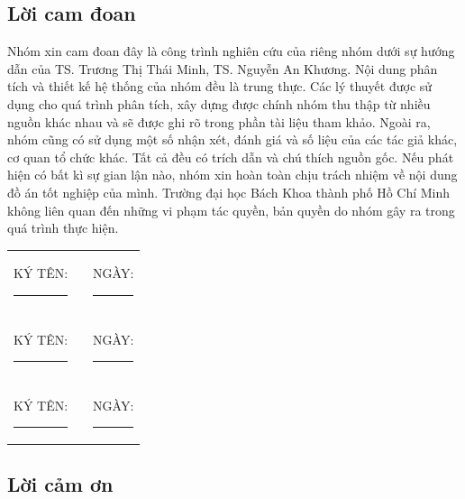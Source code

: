 \documentclass[a4paper, twoside, 12pt]{report}
\theoremstyle{definition}
\newcommand{\setupfont}[1]{\fontsize{#1}{#1}\selectfont}
\begin{document}
\setupfont{13pt}

\clearpage
\thispagestyle{empty}
\hfill
\clearpage


\setlength{\parskip}{2.5mm}
\thispagestyle{plain}
\begin{center}
	\section*{Lời cam đoan}
\end{center}

Nhóm xin cam đoan đây là công trình nghiên cứu của riêng nhóm dưới sự hướng dẫn của TS. Trương Thị Thái Minh, TS. Nguyễn An Khương. Nội dung phân tích và thiết kế hệ thống của nhóm đều là trung thực. Các lý thuyết được sử dụng cho quá trình phân tích, xây dựng được chính nhóm thu thập từ nhiều nguồn khác nhau và sẽ được ghi rõ trong phần tài liệu tham khảo. Ngoài ra, nhóm cũng có sử dụng một số nhận xét, đánh giá và số liệu của các tác giả khác, cơ quan tổ chức khác. Tất cả đều có trích dẫn và chú thích nguồn gốc. Nếu phát hiện có bất kì sự gian lận nào, nhóm xin hoàn toàn chịu trách nhiệm về nội dung đồ án tốt nghiệp của mình. Trường đại học Bách Khoa thành phố Hồ Chí Minh không liên quan đến những vi phạm tác quyền, bản quyền do nhóm gây ra trong quá trình thực hiện.

\vspace{1cm}

\begin{center}
	\begin{tabular}{c c c}
		KÝ TÊN: \rule{4cm}{0.15mm} & \hspace{4cm} & NGÀY: \rule{4cm}{0.15mm} \\ \\
		KÝ TÊN: \rule{4cm}{0.15mm} & \hspace{4cm} & NGÀY: \rule{4cm}{0.15mm} \\ \\
		KÝ TÊN: \rule{4cm}{0.15mm} & \hspace{4cm} & NGÀY: \rule{4cm}{0.15mm}
	\end{tabular}
\end{center}
\setlength{\parskip}{0mm}

\newpage

\setlength{\parskip}{2.5mm}
\thispagestyle{plain}
\begin{center}
	\section*{Lời cảm ơn}
\end{center}
\end{document}
